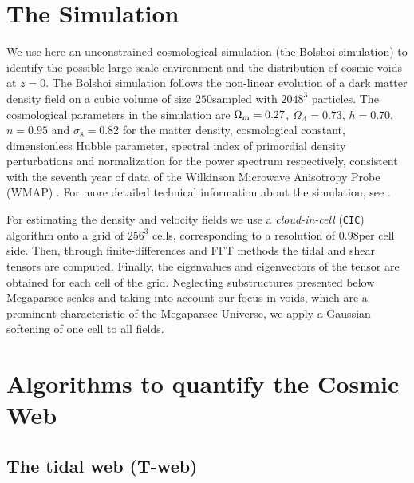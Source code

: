 \documentclass[a4,useAMS,usenatbib,usegraphicx]{latex/mn2e}
\begin{document}
\section{The Simulation}
\label{sec:the_simulation}


We use here an unconstrained cosmological simulation (the Bolshoi 
simulation) to identify the possible large scale environment and the 
distribution of cosmic voids at $z=0$. The Bolshoi simulation follows the 
non-linear evolution of a dark matter density field on a cubic volume of 
size $250$\hMpc sampled with $2048^3$ particles. The cosmological 
parameters in the simulation are $\Omega_{\rm m}=0.27$, $\Omega_{\Lambda}
=0.73$, $h=0.70$, $n=0.95$ and $\sigma_{8}=0.82$ for the matter density, 
cosmological constant, dimensionless Hubble parameter, spectral index of 
primordial density perturbations and normalization for the power spectrum
respectively, consistent with the seventh year of data of the Wilkinson 
Microwave Anisotropy Probe (WMAP) \citep{Jarosik11}. For more detailed 
technical information about the simulation, see \citet{Klypin11}.


For estimating the density and velocity fields we use a 
\textit{cloud-in-cell} (\texttt{CIC}) algorithm onto a grid of $256^3$ 
cells, corresponding to a resolution of $0.98$\hMpc per cell side. Then, 
through finite-differences and FFT methods the tidal and shear tensors 
are computed. Finally, the eigenvalues and eigenvectors of the tensor are
obtained for each cell of the grid. Neglecting substructures presented 
below Megaparsec scales and taking into account our focus in voids, which
are a prominent characteristic of the Megaparsec Universe, we apply a 
Gaussian softening of one cell to all fields.



\section{Algorithms to quantify the Cosmic Web}
\label{sec:algorithms_cosmic_web}


\subsection{The tidal web (T-web)}
\label{subsec:Tweb}
\end{document}
